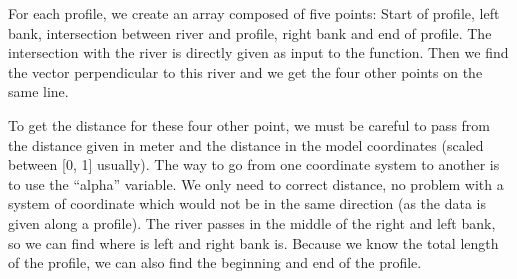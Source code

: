 \documentclass[letterpaper,10pt,english]{sphinxmanual}
\begin{document}
\begin{fulllineitems}

For each profile, we create an array composed of five points: Start of profile, left bank, intersection between
river and profile, right bank and end of profile. The intersection with the river is directly given as input to
the function. Then we find the vector perpendicular to this river and we get the four other points on the same line.

To get the distance for these four other point, we must be careful to pass from the distance given in meter and the
distance in the model coordinates (scaled between {[}0, 1{]} usually). The way to go from one coordinate system to
another is to use the “alpha” variable.  We only need to correct distance, no problem with a system of coordinate
which would not be in the same direction (as the data is given along a profile). The river passes in the middle of
the right and left bank, so we can find where is left and right bank is. Because we know the total length of the
profile, we can also find the beginning and end of the profile.

\end{fulllineitems}

\end{document}
